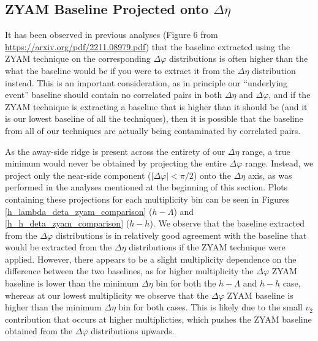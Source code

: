 \documentclass[ALICE,manyauthors]{ALICE_analysis_notes}
\begin{document}
\clearpage


\subsection{ZYAM Baseline Projected onto $\Delta\eta$}
It has been observed in previous analyses (Figure 6 from \url{https://arxiv.org/pdf/2211.08979.pdf}) that the baseline extracted using the ZYAM technique on the corresponding $\Delta\varphi$ distributions is often higher than the what the baseline would be if you were to extract it from the $\Delta\eta$ distribution instead. This is an important consideration, as in principle our ``underlying event'' baseline should contain no correlated pairs in both $\Delta\eta$ and $\Delta\varphi$, and if the ZYAM technique is extracting a baseline that is higher than it should be (and it is our lowest baseline of all the techniques), then it is possible that the baseline from all of our techniques are actually being contaminated by correlated pairs.

As the away-side ridge is present across the entirety of our $\Delta\eta$ range, a true minimum would never be obtained by projecting the entire $\Delta\varphi$ range. Instead, we project only the near-side component ($|\Delta\varphi| < \pi/2$) onto the $\Delta\eta$ axis, as was performed in the analyses mentioned at the beginning of this section. Plots containing these projections for each multiplicity bin can be seen in Figures \ref{h_lambda_deta_zyam_comparison} ($h-\Lambda$) and \ref{h_h_deta_zyam_comparison}  ($h-h$). We observe that the baseline extracted from the $\Delta\varphi$ distributions is in relatively good agreement with the baseline that would be extracted from the $\Delta\eta$ distributions if the ZYAM technique were applied. However, there appears to be a slight multiplicity dependence on the difference between the two baselines, as for higher multiplicity the $\Delta\varphi$ ZYAM baseline is lower than the minimum $\Delta\eta$ bin for both the $h-\Lambda$ and $h-h$ case, whereas at our lowest multiplicity we observe that the $\Delta\varphi$ ZYAM baseline is higher than the minimum $\Delta\eta$ bin for both cases. This is likely due to the small $v_{2}$ contribution that occurs at higher multiplicties, which pushes the ZYAM baseline obtained from the $\Delta\varphi$ distributions upwards.

\clearpage
\end{document}
